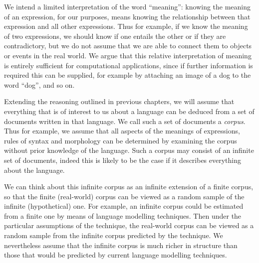 \documentclass[12pt]{report}
\begin{document}
We intend a limited interpretation of the word ``meaning'': knowing the meaning of an expression, for our purposes, means knowing the relationship between that expression and all other expressions.
Thus for example, if we know the meaning of two expressions, we should know if one entails the other or if they are contradictory, but we do not assume that we are able to connect them to objects or events in the real world. We argue that this relative interpretation of meaning is entirely sufficient for computational applications, since if further information is required this can be supplied, for example by attaching an image of a dog to the word ``dog'', and so on.

Extending the reasoning outlined in previous chapters, we will assume that everything that is of interest to us about a language can be deduced from a set of documents written in that language.
We call such a set of documents a \emph{corpus}. Thus for example, we assume that all aspects of the meanings of expressions, rules of syntax and morphology can be determined by examining the corpus without prior knowledge of the language. Such a corpus may consist of an infinite set of documents, indeed this is likely to be the case if it describes everything about the language.


We can think about this infinite corpus as an infinite extension of a finite corpus, so that the finite (real-world) corpus can be viewed as a random sample of the infinite (hypothetical) one. For example, an infinite corpus could be estimated from a finite one by means of language modelling techniques. Then under the particular assumptions of the technique, the real-world corpus can be viewed as a random sample from the infinite corpus predicted by the technique. We nevertheless assume that the infinite corpus is much richer in structure than those that would be predicted by current language modelling techniques.
\end{document}
